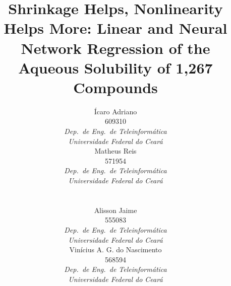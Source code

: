 \documentclass[conference]{IEEEtran}
\begin{document}
\title{Shrinkage Helps, Nonlinearity Helps More: Linear and Neural
Network Regression of the Aqueous Solubility of 1{,}267 Compounds}

\newcommand{\autorbloco}[2]{%
  \begin{minipage}[t]{0.46\textwidth}\centering
  {\normalsize #1}\\[0.35em]
  {\small #2\\
  \textit{Dep.\ de Eng.\ de Teleinformática}\\
  \textit{Universidade Federal do Ceará}}
  \end{minipage}}

\author{%
\parbox{\textwidth}{\centering
\autorbloco{Ícaro Adriano}{609310}\hfill\autorbloco{Matheus Reis}{571954}\\[1.4em]
\autorbloco{Alisson Jaime}{555083}\hfill\autorbloco{Vinícius A. G. do Nascimento}{568594}}
}

\maketitle
\end{document}
